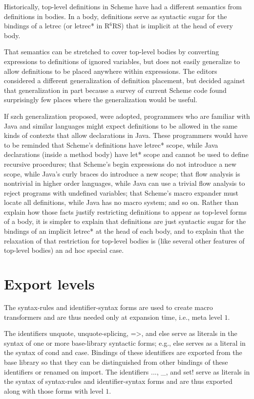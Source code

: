 \documentclass[twoside,twocolumn]{algol60}
\newcommand{\rn}[1]{R$^{#1}$RS}
\begin{document}
Historically, top-level definitions in Scheme have had a different
semantics from definitions in bodies.  In a body, definitions serve as
syntactic sugar for the bindings of a {\cf letrec} (or {\cf letrec*}
in \rn{6}) that is implicit at the head of every body.

That semantics can be stretched to cover top-level bodies by
converting expressions to definitions of ignored variables, but does
not easily generalize to allow definitions to be placed anywhere
within expressions.  The editors considered a different generalization
of definition placement, but decided against that generalization in
part because a survey of current Scheme code found surprisingly few
places where the generalization would be useful.

If szch generalization proposed, were adopted, programmers who are
familiar with Java and similar languages might expect definitions to
be allowed in the same kinds of contexts that allow declarations in
Java.  These programmers would have to be reminded that Scheme's
definitions have {\cf letrec*} scope, while Java declarations (inside
a method body) have {\cf let*} scope and cannot be used to define
recursive procedures; that Scheme's begin expressions do not introduce
a new scope, while Java's curly braces do introduce a new scope; that
flow analysis is nontrivial in higher order languages, while Java can
use a trivial flow analysis to reject programs with undefined
variables; that Scheme's macro expander must locate all definitions,
while Java has no macro system; and so on.  Rather than explain how
those facts justify restricting definitions to appear as top-level
forms of a body, it is simpler to explain that definitions are just
syntactic sugar for the bindings of an implicit {\cf letrec*} at the
head of each body, and to explain that the relaxation of that
restriction for top-level bodies is (like several other features of
top-level bodies) an ad hoc special case.

\section{Export levels}

The {\cf syntax-rules} and {\cf identifier-syntax} forms are
used to create macro transformers and are thus needed only at
expansion time, i.e., meta level $1$.  

The identifiers {\cf unquote}, {\cf unquote-splicing}, {\cf =>}, and
{\cf else} serve as literals in the syntax of one or more
base-library syntactic forms; e.g., {\cf else} serves as a
literal in the syntax of {\cf cond} and {\cf case}.
Bindings of these identifiers are exported from the base library so
that they can be distinguished from other bindings of these identifiers
or renamed on import.
The identifiers {\cf ...}, {\cf \_}, and {\cf set!} serve as
literals in the syntax of {\cf syntax-rules} and
{\cf identifier-syntax} forms and are thus exported along with those
forms with level $1$.
\end{document}
